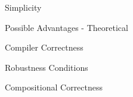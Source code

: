 \documentclass[notes, xcolor = dvipsnames]{beamer}
\begin{document}
    \begin{frame}{Simplicity}

             
    \end{frame}

    \begin{frame}{Possible Advantages - Theoretical}


    \end{frame}

    \begin{frame}{Compiler Correctness}
        

    \end{frame}

    \begin{frame}{Robustness Conditions}
        


    \end{frame}

    \begin{frame}{Compositional Correctness}
        

    \end{frame}
\end{document}
